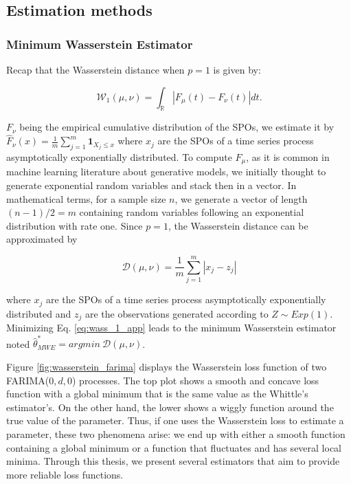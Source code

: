 \documentclass[
  11pt,
]{article}
\begin{document}
\newpage

\hypertarget{estimation-methods}{%
\subsection{Estimation methods}\label{estimation-methods}}

\hypertarget{minimum-wasserstein-estimator}{%
\subsubsection{Minimum Wasserstein
Estimator}\label{minimum-wasserstein-estimator}}

Recap that the Wasserstein distance when \(p = 1\) is given by:

\begin{equation}
\mathcal{W}_{1}(\mu, \nu)=\int_{\mathbb{R}}\left|F_{\mu}(t)-F_{\nu}(t)\right| d t.
\end{equation}

\(F_\nu\) being the empirical cumulative distribution of the SPOs, we
estimate it by
\(\hat F_\nu(x) = \frac{1}{m} \sum_{j=1}^{m} \mathbf{1}_{X_{j} \leq x}\)
where \(x_j\) are the SPOs of a time series process asymptotically
exponentially distributed. To compute \(F_\mu\), as it is common in
machine learning literature about generative models, we initially
thought to generate exponential random variables and stack then in a
vector. In mathematical terms, for a sample size \(n\), we generate a
vector of length \((n-1)/2 = m\) containing random variables following
an exponential distribution with rate one. Since \(p = 1\), the
Wasserstein distance can be approximated by

\begin{equation}
\mathcal{D}(\mu, \nu) = \frac{1}{m} \sum_{j = 1}^{m} |x_j - z_j| 
\label{eq:wass_1_app}
\end{equation}

where \(x_j\) are the SPOs of a time series process asymptotically
exponentially distributed and \(z_j\) are the observations generated
according to \(Z \sim Exp(1)\). Minimizing Eq. \ref{eq:wass_1_app} leads
to the minimum Wasserstein estimator noted
\(\hat \theta^*_{MWE} = argmin \  \mathcal{D}(\mu, \nu)\).

Figure \ref{fig:wasserstein_farima} displays the Wasserstein loss
function of two FARIMA(\(0,d,0\)) processes. The top plot shows a smooth
and concave loss function with a global minimum that is the same value
as the Whittle's estimator's. On the other hand, the lower shows a
wiggly function around the true value of the parameter. Thus, if one
uses the Wasserstein loss to estimate a parameter, these two phenomena
arise: we end up with either a smooth function containing a global
minimum or a function that fluctuates and has several local minima.
Through this thesis, we present several estimators that aim to provide
more reliable loss functions.
\end{document}
